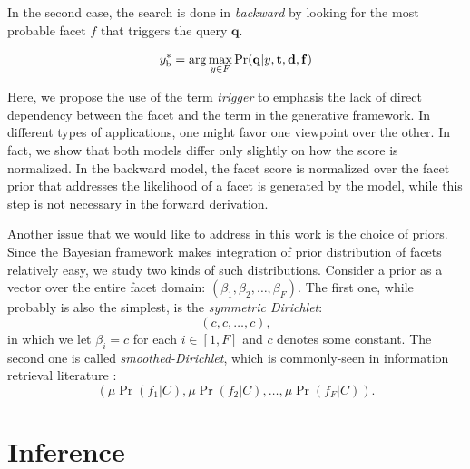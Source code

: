 In the second case, the search is done in \emph{backward} by looking for the
most probable facet $f$ that triggers the query $\mathbf{q}$.

\begin{equation}y^*_{\rm b} = \arg\max_{y \in F} \Pr(\mathbf{q}|y, \mathbf{t},
\mathbf{d}, \mathbf{f}) \label{eq:backward} \end{equation}

Here, we propose the use of the term \emph{trigger} to emphasis the lack of
direct dependency between the facet and the term in the generative framework.
In different types of applications, one might favor one viewpoint over the
other.  In fact, we show that both models differ only slightly on how the score
is normalized.  In the backward model, the facet score is normalized over the
facet prior that addresses the likelihood of a facet is generated by the model,
while this step is not necessary in the forward derivation.

Another issue that we would like to address in this work is the choice of
priors.  Since the Bayesian framework makes integration of prior distribution
of facets relatively easy, we study two kinds of such distributions.  Consider
a prior as a vector over the entire facet domain: $(\beta_1, \beta_2, \ldots,
\beta_F)$.  The first one, while probably is also the simplest, is the
\emph{symmetric Dirichlet}: \[ (c, c, \ldots, c), \] in which we let $\beta_i = c$ for
each $i \in [1, F]$ and $c$ denotes some constant.  The second one is called
\emph{smoothed-Dirichlet}, which is commonly-seen in information retrieval
literature \cite{zhai2004study}: \[ (\mu \Pr(f_1|C), \mu \Pr(f_2|C), \ldots, \mu \Pr(f_F|C)). \]

\section{Inference}\label{s:inference}

